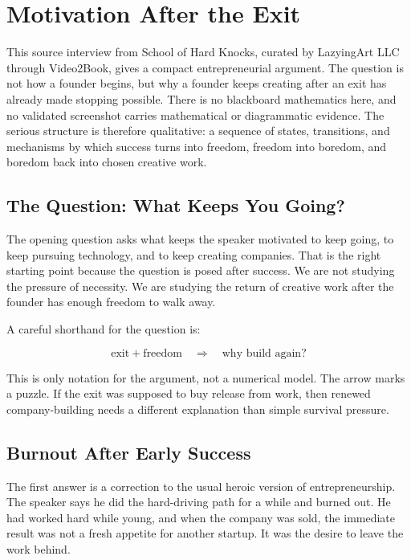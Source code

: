 \chapter{Motivation After the Exit}

This source interview from School of Hard Knocks, curated by LazyingArt LLC through Video2Book, gives a compact entrepreneurial argument. The question is not how a founder begins, but why a founder keeps creating after an exit has already made stopping possible. There is no blackboard mathematics here, and no validated screenshot carries mathematical or diagrammatic evidence. The serious structure is therefore qualitative: a sequence of states, transitions, and mechanisms by which success turns into freedom, freedom into boredom, and boredom back into chosen creative work.

\section{The Question: What Keeps You Going?}

The opening question asks what keeps the speaker motivated to keep going, to keep pursuing technology, and to keep creating companies. That is the right starting point because the question is posed after success. We are not studying the pressure of necessity. We are studying the return of creative work after the founder has enough freedom to walk away.

A careful shorthand for the question is:

\begin{equation}
\text{exit} + \text{freedom}
\quad \Longrightarrow \quad
\text{why build again?}
\end{equation}

This is only notation for the argument, not a numerical model. The arrow marks a puzzle. If the exit was supposed to buy release from work, then renewed company-building needs a different explanation than simple survival pressure.

\section{Burnout After Early Success}

The first answer is a correction to the usual heroic version of entrepreneurship. The speaker says he did the hard-driving path for a while and burned out. He had worked hard while young, and when the company was sold, the immediate result was not a fresh appetite for another startup. It was the desire to leave the work behind.

